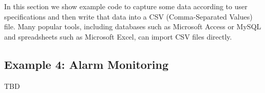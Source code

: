 \label{sec:example-file}

In this section we show example code to capture some data according to
user specifications and then write that data into a CSV (Comma-Separated
Values) file.  Many popular tools, including databases such as Microsoft
Access or MySQL and spreadsheets such as Microsoft Excel, can import CSV
files directly.

\subsection{Example 4: Alarm Monitoring}
\label{sec:example-alarm}

TBD
